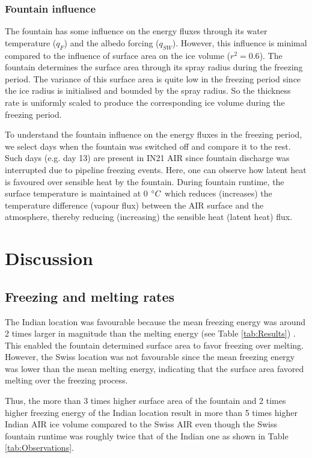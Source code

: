 \documentclass[utf8]{frontiersSCNS} %
\begin{document}
\subsubsection{Fountain influence}

The fountain has some influence on the energy fluxes through its water temperature ($q_{F}$) and the albedo forcing
($q_{SW}$). However, this influence is minimal compared to the influence of surface area on the ice volume
($r^2=0.6$). The fountain determines the surface area through its spray radius during the freezing period. The
variance of this surface area is quite low in the freezing period since the ice radius is initialised and bounded
by the spray radius. So the thickness rate is uniformly scaled to produce the corresponding ice volume during the
freezing period.

To understand the fountain influence on the energy fluxes in the freezing period, we select days when the
fountain was switched off and compare it to the rest. Such days (e.g. day 13) are present in IN21 AIR since
fountain discharge was interrupted due to pipeline freezing events. Here, one can observe how latent heat is
favoured over sensible heat by the fountain. During fountain runtime, the surface temperature is maintained at 0
$\degree C$ which reduces (increases) the temperature difference (vapour flux) between the AIR surface and the
atmosphere, thereby reducing (increasing) the sensible heat (latent heat) flux.

\section{Discussion}

\subsection{Freezing and melting rates}

The Indian location was favourable because the mean freezing energy was around 2 times larger in magnitude than the
melting energy (see Table \ref{tab:Results}) . This enabled the fountain determined surface area to favor freezing over melting. However, the
Swiss location was not favourable since the mean freezing energy was lower than the mean melting energy, indicating that the
surface area favored melting over the freezing process.

Thus, the more than 3 times higher surface area of the fountain and 2 times higher freezing energy of the Indian
location result in more than 5 times higher Indian AIR ice volume compared to the Swiss AIR even though the Swiss
fountain runtime was roughly twice that of the Indian one as shown in Table \ref{tab:Observations}.
\end{document}
